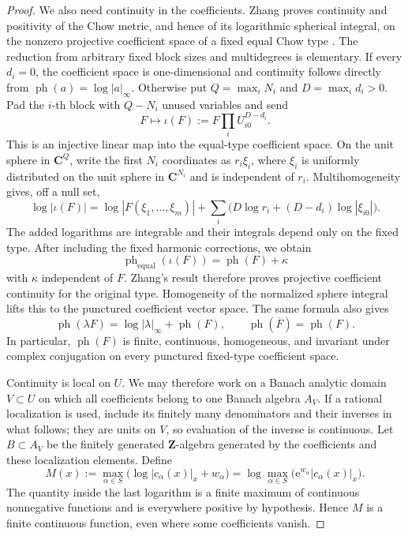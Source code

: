 \begin{proof}
We also need continuity in the coefficients.  Zhang proves continuity and
positivity of the Chow metric, and hence of its logarithmic spherical
integral, on the nonzero projective coefficient space of a fixed equal
Chow type \cite[Section~1.5 and Theorem~3.6(1)]{Zhang96Semistable}.
The reduction from arbitrary fixed block sizes and multidegrees is
elementary.  If every \(d_i=0\), the coefficient space is one-dimensional
and continuity follows directly from
\(\operatorname{ph}(a)=\log|a|_\infty\).  Otherwise put
\(Q=\max_iN_i\) and \(D=\max_i d_i>0\).  Pad the \(i\)-th
block with \(Q-N_i\) unused variables and send
\begin{equation}\label{eq:hybrid-philippon-padding}
 F\longmapsto\iota(F):=F\prod_iU_{i0}^{D-d_i}.
\end{equation}
This is an injective linear map into the equal-type coefficient space.  On
the unit sphere in \(\mathbf C^Q\), write the first \(N_i\) coordinates as
\(r_i\xi_i\), where \(\xi_i\) is uniformly distributed on the unit sphere
in \(\mathbf C^{N_i}\) and is independent of \(r_i\).  Multihomogeneity
gives, off a null set,
\[
 \log|\iota(F)|=
 \log|F(\xi_1,\ldots,\xi_m)|
 +\sum_i\bigl(D\log r_i+(D-d_i)\log|\xi_{i0}|\bigr).
\]
The added logarithms are integrable and their integrals depend only on the
fixed type.  After including the fixed harmonic corrections, we obtain
\[
 \operatorname{ph}_{\mathrm{equal}}(\iota(F))
 =\operatorname{ph}(F)+\kappa
\]
with \(\kappa\) independent of \(F\).  Zhang's result therefore proves
projective coefficient continuity for the original type.  Homogeneity of
the normalized sphere integral lifts this to the punctured coefficient
vector space.  The same formula also gives
\begin{equation}\label{eq:hybrid-philippon-complex-homogeneity}
 \operatorname{ph}(\lambda F)=\log|\lambda|_\infty+
 \operatorname{ph}(F),
 \qquad
 \operatorname{ph}(\overline F)=\operatorname{ph}(F).
\end{equation}
In particular, \(\operatorname{ph}(F)\) is finite, continuous, homogeneous,
and invariant under complex conjugation on every punctured fixed-type
coefficient space.

Continuity is local on \(U\).  We may therefore work on a Banach analytic
domain \(V\subset U\) on which all coefficients belong to one Banach
algebra \(A_V\).  If a rational localization is used, include its finitely
many denominators and their inverses in what follows; they are units on
\(V\), so evaluation of the inverse is continuous.  Let \(B\subset A_V\)
be the finitely generated \(\mathbf Z\)-algebra generated by the
coefficients and these localization elements.  Define
\begin{equation}\label{eq:hybrid-philippon-max-function}
 M(x):=\max_{\alpha\in S}
 \bigl(\log|c_\alpha(x)|_x+w_\alpha\bigr)
 =\log\max_{\alpha\in S}
 \bigl(\mathrm e^{w_\alpha}|c_\alpha(x)|_x\bigr).
\end{equation}
The quantity inside the last logarithm is a finite maximum of continuous
nonnegative functions and is everywhere positive by hypothesis.  Hence
\(M\) is a finite continuous function, even where some coefficients vanish.


\end{proof}
